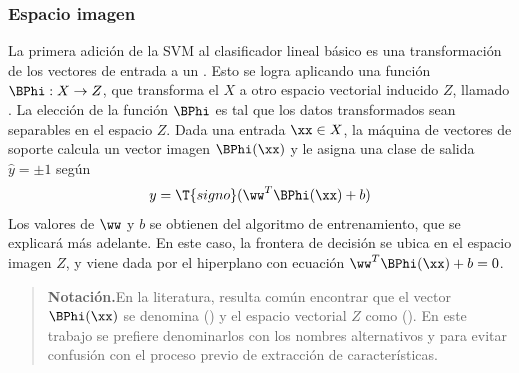%
\subsubsection{Espacio imagen}
%
La primera adición de la SVM al clasificador lineal básico es una
transformación de los vectores de entrada a un .
Esto se logra aplicando una función $\BPhi:X\rightarrow{}Z$, que
transforma el  $X$ a otro espacio vectorial
inducido $Z$, llamado .
La elección de la función $\BPhi$ es tal que los datos transformados
sean separables en el espacio $Z$.
Dada una entrada $\xx\in{}X$, la máquina de vectores de soporte
calcula un vector imagen $\BPhi(\xx)$ y le asigna una clase de
salida $\hat{y}=\pm{}1$ según
%
\begin{align*}
  y = \T{signo}(\ww^T \BPhi(\xx)+b)
\end{align*}
%
Los valores de $\ww$ y $b$ se obtienen del algoritmo de entrenamiento,
que se explicará más adelante.
En este caso, la frontera de decisión se ubica en el espacio imagen
$Z$, y viene dada por el hiperplano con ecuación
$\ww^T\BPhi(\xx)+b=0$.
%
\begin{quote}
  {\bfseries Notación.}\quad{}En la literatura, resulta común
  encontrar que el vector $\BPhi(\xx)$ se denomina  () y el espacio vectorial $Z$
  como  ().  En
  este trabajo se prefiere denominarlos con los nombres alternativos
   y  para evitar
  confusión con el proceso previo de extracción de características.
\end{quote}
%
